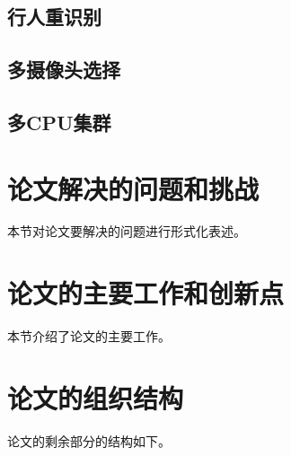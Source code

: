 \subsection{行人重识别}

\subsection{多摄像头选择}

\subsection{多CPU集群}

\section{论文解决的问题和挑战}
本节对论文要解决的问题进行形式化表述。

\section{论文的主要工作和创新点}
本节介绍了论文的主要工作。

\section{论文的组织结构}
论文的剩余部分的结构如下。